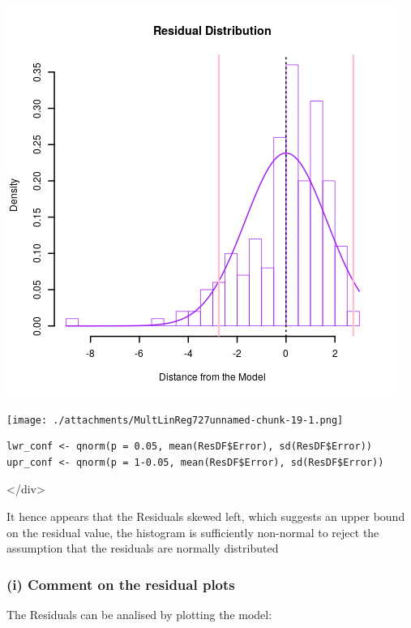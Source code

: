 \documentclass[11pt]{article}
\begin{document}
\begin{enumerate}
\begin{center}
\includegraphics[width=.9\linewidth]{BasePlotResidualHistMultLinReg.png}
\end{center}

\begin{center}
\texttt{[image: ./attachments/MultLinReg727unnamed-chunk-19-1.png]}
\end{center}

\begin{verbatim}
lwr_conf <- qnorm(p = 0.05, mean(ResDF$Error), sd(ResDF$Error))
upr_conf <- qnorm(p = 1-0.05, mean(ResDF$Error), sd(ResDF$Error))
\end{verbatim}

\begin{HTML}
</div>
\end{HTML}

It hence appears that the Residuals skewed left, which suggests an upper
bound on the residual value, the histogram is sufficiently non-normal to
reject the assumption that the residuals are normally distributed
\end{enumerate}

\subsubsection{(i) Comment on the residual plots}
\label{sec:orga06e321}
The Residuals can be analised by plotting the model:
\end{document}
